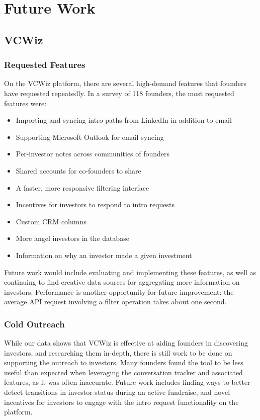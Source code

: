\section{Future Work}

\subsection{VCWiz}

\subsubsection{Requested Features}

On the VCWiz platform, there are several high-demand features that founders have requested repeatedly. In a survey of 118 founders, the most requested features were:

\begin{itemize}
  \item Importing and syncing intro paths from LinkedIn in addition to email
  \item Supporting Microsoft Outlook for email syncing
  \item Per-investor notes across communities of founders
  \item Shared accounts for co-founders to share
  \item A faster, more responsive filtering interface
  \item Incentives for investors to respond to intro requests
  \item Custom CRM columns
  \item More angel investors in the database
  \item Information on why an investor made a given investment
\end{itemize}

Future work would include evaluating and implementing these features, as well as continuing to find creative data sources for aggregating more information on investors. Performance is another opportunity for future improvement: the average API request involving a filter operation takes about one second.

\subsubsection{Cold Outreach}

While our data shows that VCWiz is effective at aiding founders in discovering investors, and researching them in-depth, there is still work to be done on supporting the outreach to investors. Many founders found the tool to be less useful than expected when leveraging the conversation tracker and associated features, as it was often inaccurate. Future work includes finding ways to better detect transitions in investor status during an active fundraise, and novel incentives for investors to engage with the intro request functionality on the platform.

